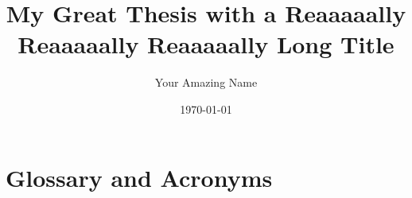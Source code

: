 \documentclass[
	verbose,
	english,
	type=bachelor-thesis, %
	license=CCBY, %
	paper=a4,  %
]{thesis}
\title{My Great Thesis with a Reaaaaally Reaaaaally Reaaaaally Long Title}
\author{Your Amazing Name}
\date{\today}
\begin{document}
\hideindraft{
	\frontmatter
		\maketitle
	
		
		
	
		\tableofcontents
		\listoffigures
		\listoftables
	}
	
	\mainmatter
	
	
	
	
	
	

	\backmatter
	\printbibliography

	\let\clearpage\newpage
	\let\cleardoublepage\newpage
	\chapter{Glossary and Acronyms}
	\printglossaries
\end{document}
